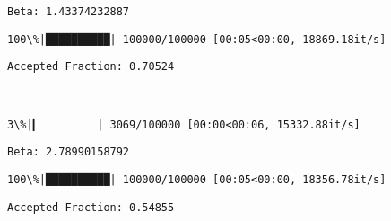 \documentclass[11pt]{article}
\begin{document}
    \begin{Verbatim}[commandchars=\\\{\}]
Beta: 1.43374232887

    \end{Verbatim}

    \begin{Verbatim}[commandchars=\\\{\}]
100\%|██████████| 100000/100000 [00:05<00:00, 18869.18it/s]

    \end{Verbatim}

    \begin{Verbatim}[commandchars=\\\{\}]
Accepted Fraction: 0.70524

    \end{Verbatim}

    \begin{center}
    \end{center}
    { \hspace*{\fill} \\}
    
    \begin{Verbatim}[commandchars=\\\{\}]
  3\%|▎         | 3069/100000 [00:00<00:06, 15332.88it/s]
    \end{Verbatim}

    \begin{Verbatim}[commandchars=\\\{\}]
Beta: 2.78990158792

    \end{Verbatim}

    \begin{Verbatim}[commandchars=\\\{\}]
100\%|██████████| 100000/100000 [00:05<00:00, 18356.78it/s]

    \end{Verbatim}

    \begin{Verbatim}[commandchars=\\\{\}]
Accepted Fraction: 0.54855

    \end{Verbatim}

    \begin{center}
    \end{center}
    { \hspace*{\fill} \\}
    
\end{document}
